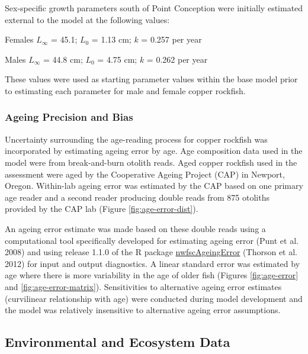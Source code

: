 \documentclass[11pt,
  english,
  letterpaper,
]{article}
\begin{document}
Sex-specific growth parameters south of Point Conception were initially estimated external to the model at the following values:

\begin{centering}

Females $L_{\infty}$ = 45.1; $L_0$ = 1.13 cm; $k$ = 0.257 per year

Males $L_{\infty}$ = 44.8 cm; $L_0$ = 4.75 cm; $k$ = 0.262 per year

\end{centering}

\vspace{0.50cm}

These values were used as starting parameter values within the base model prior to estimating each parameter for male and female copper rockfish.

\hypertarget{ageing-precision-and-bias}{%
\subsubsection{Ageing Precision and Bias}\label{ageing-precision-and-bias}}

Uncertainty surrounding the age-reading process for copper rockfish was incorporated by estimating ageing error by age. Age composition data used in the model were from break-and-burn otolith reads. Aged copper rockfish used in the assessment were aged by the Cooperative Ageing Project (CAP) in Newport, Oregon. Within-lab ageing error was estimated by the CAP based on one primary age reader and a second reader producing double reads from 875 otoliths provided by the CAP lab (Figure \ref{fig:age-error-dist}).

An ageing error estimate was made based on these double reads using a computational tool specifically developed for estimating ageing error (Punt et al. 2008) and using release 1.1.0 of the R package \href{https://github.com/nwfsc-assess/nwfscAgeingError}{nwfscAgeingError} (Thorson et al. 2012) for input and output diagnostics. A linear standard error was estimated by age where there is more variability in the age of older fish (Figures \ref{fig:age-error} and \ref{fig:age-error-matrix}). Sensitivities to alternative ageing error estimates (curvilinear relationship with age) were conducted during model development and the model was relatively insensitive to alternative ageing error assumptions.

\hypertarget{environmental-and-ecosystem-data}{%
\subsection{Environmental and Ecosystem Data}\label{environmental-and-ecosystem-data}}
\end{document}
